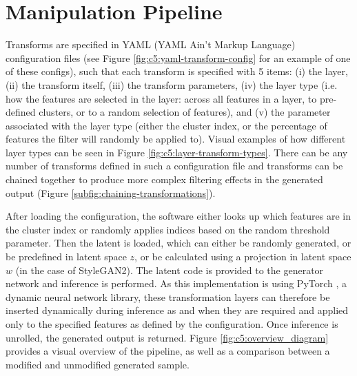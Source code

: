 \section{Manipulation Pipeline}

Transforms are specified in YAML (YAML Ain't Markup Language) configuration files \citep{ben2009yaml} (see Figure \ref{fig:c5:yaml-transform-config} for an example of one of these configs), such that each transform is specified with 5 items: (i) the layer, (ii) the transform itself, (iii) the transform parameters, (iv) the layer type (i.e. how the features are selected in the layer: across all features in a layer, to pre-defined clusters, or to a random selection of features), and (v) the parameter associated with the layer type (either the cluster index, or the percentage of features the filter will randomly be applied to). 
Visual examples of how different layer types can be seen in Figure \ref{fig:c5:layer-transform-types}.
There can be any number of transforms defined in such a configuration file and transforms can be chained together to produce more complex filtering effects in the generated output (Figure \ref{subfig:chaining-transformations}).

After loading the configuration, the software either looks up which features are in the cluster index or randomly applies indices based on the random threshold parameter. 
Then the latent is loaded, which can either be randomly generated, or be predefined in latent space $z$, or be calculated using a projection in latent space $w$ \citep{abdal2019image2stylegan,karras2019analyzing} (in the case of StyleGAN2). The latent code is provided to the generator network and inference is performed. 
As this implementation is using PyTorch \citep{paszke2019pytorch}, a dynamic neural network library, these transformation layers can therefore be inserted dynamically during inference as and when they are required and applied only to the specified features as defined by the configuration. 
Once inference is unrolled, the generated output is returned. Figure \ref{fig:c5:overview_diagram} provides a visual overview of the pipeline, as well as a comparison between a modified and unmodified generated sample.

